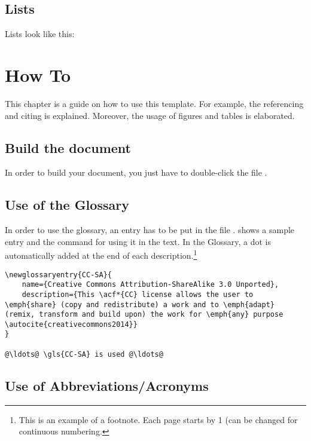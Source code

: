 \section{Lists}
\label{sec:Lists}

Lists look like this:

\blinditemize[5]


\chapter{How To}
\label{cha:HowTo}

This chapter is a guide on how to use this template. For example, the referencing and citing is explained. Moreover, the usage of figures and tables is elaborated.

\section{Build the document}
\label{sec:BuildDocument}

In order to build your document, you just have to double-click the file .

\section{Use of the Glossary}
\label{sec:UseGlossary}

In order to use the glossary, an entry has to be put in the file .  shows a sample entry and the command for using it in the text. In the Glossary, a dot is automatically added at the end of each description.\footnote{This is an example of a footnote. Each page starts by 1 (can be changed for continuous numbering.}

\begin{lstlisting}[language={[LaTeX]TeX},label={lst:glossary},caption={The use of the Glossary.}]
\newglossaryentry{CC-SA}{
	name={Creative Commons Attribution-ShareAlike 3.0 Unported},
	description={This \acf*{CC} license allows the user to \emph{share} (copy and redistribute) a work and to \emph{adapt} (remix, transform and build upon) the work for \emph{any} purpose \autocite{creativecommons2014}}
}

@\ldots@ \gls{CC-SA} is used @\ldots@
\end{lstlisting}

\section{Use of Abbreviations/Acronyms}
\label{sec:UseAcronyms}

